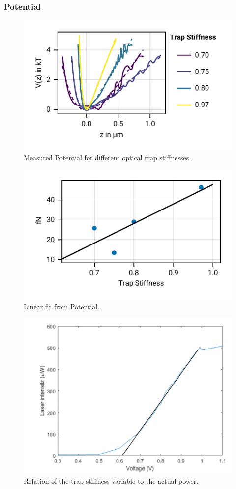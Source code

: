 \documentclass[
    twoside=false,
    twocolumn=true,
    fontsize=11pt,
]{scrarticle}
\begin{document}
\subsubsection*{Potential}
\begin{figure}
    \centering
    \includegraphics{figures/02_05_01_potential.pdf}
    \caption{Measured Potential for different optical trap stiffnesses.}
\end{figure}
\begin{figure}
    \centering
    \includegraphics{figures/02_05_02_gravity.pdf}
    \caption{Linear fit from Potential.}
\end{figure}
\begin{figure}
    \centering
    \includegraphics{figures/laser_linearity.pdf}
    \caption{Relation of the trap stiffness variable to the actual power.}
\end{figure}
\end{document}
